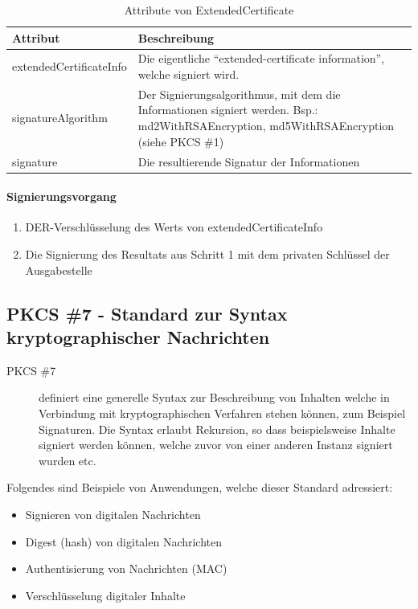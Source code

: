 \documentclass[10pt,a4paper]{article}
\begin{document}
\begin{table}[ht]
    \centering
    \begin{tabular}{|l|p{7.2cm}|} \hline
        \textbf{Attribut} & \textbf{Beschreibung} \\\hline
        extendedCertificateInfo & Die eigentliche "`extended-certificate information"',
            welche signiert wird. \\\hline
        signatureAlgorithm & Der Signierungsalgorithmus, mit dem die Informationen
            signiert werden. Bsp.: md2WithRSAEncryption, md5WithRSAEncryption (siehe PKCS
            \#1) \\\hline
        signature & Die resultierende Signatur der Informationen \\\hline
    \end{tabular}
    \caption{Attribute von ExtendedCertificate}
    \label{tab:ext-cert-attribs}
\end{table}

\paragraph{Signierungsvorgang}
\begin{enumerate}
    \item DER-Verschlüsselung des Werts von extendedCertificateInfo
    \item Die Signierung des Resultats aus Schritt 1 mit dem privaten Schlüssel der
        Ausgabestelle
\end{enumerate}

\subsection{PKCS \#7 - Standard zur Syntax kryptographischer Nachrichten}

\begin{description}
    \item[PKCS \#7] definiert eine generelle Syntax zur Beschreibung von Inhalten welche in
        Verbindung mit kryptographischen Verfahren stehen können, zum Beispiel Signaturen.
        Die Syntax erlaubt Rekursion, so dass beispielsweise Inhalte signiert werden
        können, welche zuvor von einer anderen Instanz signiert wurden etc.
\end{description}

Folgendes sind Beispiele von Anwendungen, welche dieser Standard adressiert:
\begin{itemize}
    \item Signieren von digitalen Nachrichten
    \item Digest (hash) von digitalen Nachrichten
    \item Authentisierung von Nachrichten (MAC)
    \item Verschlüsselung digitaler Inhalte
\end{itemize}
\end{document}
